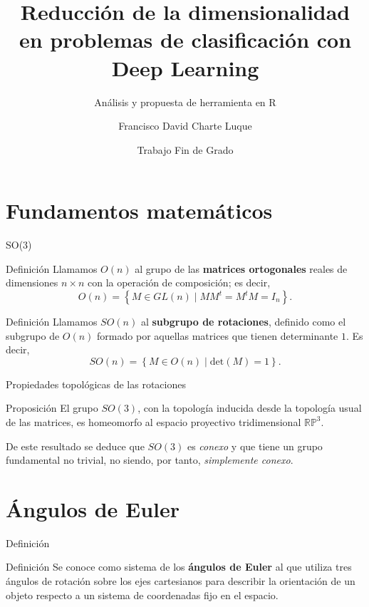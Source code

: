 \documentclass[,ignorenonframetext,compress]{beamer}
\title{Reducción de la dimensionalidad en problemas de clasificación con Deep
Learning}
\subtitle{Análisis y propuesta de herramienta en R}
\author{Francisco David Charte Luque}
\institute{Universidad de Granada}
\date{Trabajo Fin de Grado}
\begin{document}
\frame{\titlepage}

\section{Fundamentos matemáticos}

\begin{frame}{SO(3)}

\begin{exampleblock}{Definición}
  Llamamos $O(n)$ al grupo de las \textbf{matrices ortogonales} reales
  de dimensiones $n \times n$ con la operación de composición; es
  decir,
  \[O(n) = \left\{ M \in GL(n) \mid MM^t=M^tM = I_n \right\}.\]
\end{exampleblock}

\begin{exampleblock}{Definición}
  Llamamos $SO(n)$ al \textbf{subgrupo de rotaciones}, definido como
  el subgrupo de $O(n)$ formado por aquellas matrices que tienen
  determinante $1$. Es decir,
  \[SO(n) = \left\{ M \in O(n) \mid \mathrm{det}(M)=1 \right\}.\]
\end{exampleblock}

\end{frame}

\begin{frame}{Propiedades topológicas de las rotaciones}

\begin{exampleblock}{Proposición}
  El grupo $SO(3)$, con la topología inducida desde la topología usual
  de las matrices, es homeomorfo al espacio proyectivo tridimensional
  $\mathbb{RP}^3$.
\end{exampleblock}

De este resultado se deduce que \(SO(3)\) es \textit{conexo} y que tiene
un grupo fundamental no trivial, no siendo, por tanto,
\textit{simplemente conexo}.

\end{frame}

\section{Ángulos de Euler}\label{uxe1ngulos-de-euler}

\begin{frame}{Definición}

\begin{exampleblock}{Definición}
  Se conoce como sistema de los \textbf{ángulos de Euler} al que
  utiliza tres ángulos de rotación sobre los ejes cartesianos para
  describir la orientación de un objeto respecto a un sistema de
  coordenadas fijo en el espacio.
\end{exampleblock}

\end{frame}
\end{document}

